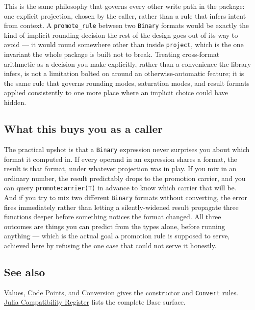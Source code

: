 This is the same philosophy that governs every other write path in the package: one explicit projection, chosen by the caller, rather than a rule that infers intent from context. A \texttt{promote\_\allowbreak{}rule} between two \texttt{Binary} formats would be exactly the kind of implicit rounding decision the rest of the design goes out of its way to avoid — it would round somewhere other than inside \texttt{project}, which is the one invariant the whole package is built not to break. Treating cross-format arithmetic as a decision you make explicitly, rather than a convenience the library infers, is not a limitation bolted on around an otherwise-automatic feature; it is the same rule that governs rounding modes, saturation modes, and result formats applied consistently to one more place where an implicit choice could have hidden.



\subsection{What this buys you as a caller}



\label{18348306953458602459}{}


The practical upshot is that a \texttt{Binary} expression never surprises you about which format it computed in. If every operand in an expression shares a format, the result is that format, under whatever projection was in play. If you mix in an ordinary number, the result predictably drops to the promotion carrier, and you can query \texttt{promotecarrier(T)} in advance to know which carrier that will be. And if you try to mix two different \texttt{Binary} formats without converting, the error fires immediately rather than letting a silently-widened result propagate three functions deeper before something notices the format changed. All three outcomes are things you can predict from the types alone, before running anything — which is the actual goal a promotion rule is supposed to serve, achieved here by refusing the one case that could not serve it honestly.



\subsection{See also}



\label{292862844209942199-dup4}{}


\href{concept\_\allowbreak{}values\_\allowbreak{}codepoints.md}{Values, Code Points, and Conversion} gives the constructor and \texttt{Convert} rules. \href{reference\_\allowbreak{}julia\_\allowbreak{}compat.md}{Julia Compatibility Register} lists the complete Base surface.



